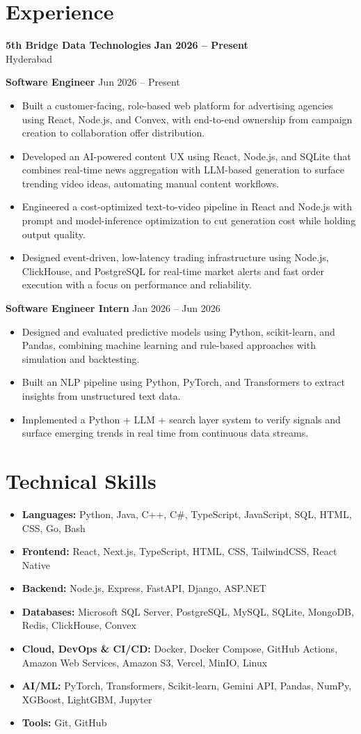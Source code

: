 \documentclass[a4paper,11pt]{article}
\newcommand{\resumeItem}[1]{\item \small{#1}}
\newcommand{\resumeSubheading}[4]{%
  \textbf{#1} \hfill \textbf{#2} \\
{#3} \hfill {#4}
}
\newcommand{\resumeSubHeadingListStart}{\begin{itemize}}
\newcommand{\resumeSubHeadingListEnd}{\end{itemize}}
\begin{document}
\section*{Experience}

\resumeSubheading
{5th Bridge Data Technologies}{Jan 2026 -- Present}
{Hyderabad}{}

\textbf{Software Engineer} \hfill {Jun 2026 -- Present}
\resumeSubHeadingListStart
\resumeItem{Built a customer-facing, role-based web platform for advertising agencies using React, Node.js, and Convex, with end-to-end ownership from campaign creation to collaboration offer distribution.}
\resumeItem{Developed an AI-powered content UX using React, Node.js, and SQLite that combines real-time news aggregation with LLM-based generation to surface trending video ideas, automating manual content workflows.}
\resumeItem{Engineered a cost-optimized text-to-video pipeline in React and Node.js with prompt and model-inference optimization to cut generation cost while holding output quality.}
\resumeItem{Designed event-driven, low-latency trading infrastructure using Node.js, ClickHouse, and PostgreSQL for real-time market alerts and fast order execution with a focus on performance and reliability.}
\resumeSubHeadingListEnd

\textbf{Software Engineer Intern} \hfill {Jan 2026 -- Jun 2026}
\resumeSubHeadingListStart
\resumeItem{Designed and evaluated predictive models using Python, scikit-learn, and Pandas, combining machine learning and rule-based approaches with simulation and backtesting.}
\resumeItem{Built an NLP pipeline using Python, PyTorch, and Transformers to extract insights from unstructured text data.}
\resumeItem{Implemented a Python + LLM + search layer system to verify signals and surface emerging trends in real time from continuous data streams.}
\resumeSubHeadingListEnd


\section*{Technical Skills}
\begin{itemize}
\item \textbf{Languages:} Python, Java, C++, C\#, TypeScript, JavaScript, SQL, HTML, CSS, Go, Bash
\item \textbf{Frontend:} React, Next.js, TypeScript, HTML, CSS, TailwindCSS, React Native
\item \textbf{Backend:} Node.js, Express, FastAPI, Django, ASP.NET
\item \textbf{Databases:} Microsoft SQL Server, PostgreSQL, MySQL, SQLite, MongoDB, Redis, ClickHouse, Convex
\item \textbf{Cloud, DevOps \& CI/CD:} Docker, Docker Compose, GitHub Actions, Amazon Web Services, Amazon S3, Vercel, MinIO, Linux
\item \textbf{AI/ML:} PyTorch, Transformers, Scikit-learn, Gemini API, Pandas, NumPy, XGBoost, LightGBM, Jupyter
\item \textbf{Tools:} Git, GitHub
\end{itemize}
\end{document}
